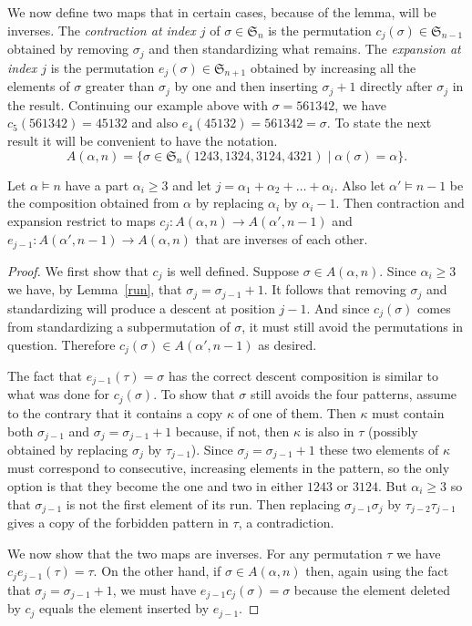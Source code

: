 \documentclass[ALCO,ThmDefs,Unicode,epreuves]{cedram}
\newcommand{\comp}{\models}
\newcommand{\ra}{\rightarrow}
\newcommand{\al}{\alpha}
\newcommand{\ka}{\kappa}
\newcommand{\si}{\sigma}
\newcommand{\fS}{{\mathfrak S}}
\begin{document}
We now define two maps that in certain cases, because of the lemma, will be inverses. The \emph{contraction at index $j$} of $\si\in\fS_n$ is the permutation $c_j(\si)\in\fS_{n-1}$ obtained by removing $\si_j$ and then standardizing what remains. The \emph{expansion at index $j$} is the permutation $e_j(\si)\in\fS_{n+1}$ obtained by increasing all the elements of $\si$ greater than $\si_j$ by one and then inserting $\si_j+1$ directly after $\si_j$ in the result. Continuing our example above with $\si= 561342$, we have $c_5(561342)=45132$ and also $e_4(45132)=561342=\si$. To state the next result it will be convenient to have the notation.
\[
A(\al,n)=\{\si\in\fS_n(1243, 1324, 3124, 4321) \mid \al(\si)=\al\}.
\]
\begin{prop}
\label{inverses}
Let $\al\comp n$ have a part $\al_i\ge3$ and let $j=\al_1+\al_2+\dots+\al_i$. Also let $\al'\comp n-1$ be the composition obtained from $\al$ by replacing $\al_i$ by $\al_i-1$. Then contraction and expansion restrict to maps $c_j:A(\al,n)\ra A(\al',n-1)$ and $e_{j-1}:A(\al',n-1)\ra A(\al,n)$ that are inverses of each other.
\end{prop}
\begin{proof}
We first show that $c_j$ is well defined. Suppose $\si\in A(\al,n)$. Since $\al_i\ge3$ we have, by Lemma~\ref{run}, that $\si_j=\si_{j-1}+1$. It follows that removing $\si_j$ and standardizing will produce a descent at position $j-1$. And since $c_j(\si)$ comes from standardizing a subpermutation of $\si$, it must still avoid the permutations in question. Therefore $c_j(\si)\in A(\al',n-1)$ as desired.

The fact that $e_{j-1}(\tau)=\si$ has the correct descent composition is similar to what was done for $c_j(\si)$. To show that $\si$ still avoids the four patterns, assume to the contrary that it contains a copy $\ka$ of one of them. Then $\ka$ must contain both $\si_{j-1}$ and $\si_j=\si_{j-1}+1$ because, if not, then $\ka$ is also in $\tau$ (possibly obtained by replacing $\si_j$ by $\tau_{j-1}$). Since $\si_j=\si_{j-1}+1$ these two elements of $\ka$ must correspond to consecutive, increasing elements in the pattern, so the only option is that they become the one and two in either $1243$ or $3124$. But $\al_i\ge3$ so that $\si_{j-1}$ is not the first element of its run. Then replacing $\si_{j-1}\si_j$ by $\tau_{j-2}\tau_{j-1}$ gives a copy of the forbidden pattern in $\tau$, a contradiction.

We now show that the two maps are inverses. For any permutation $\tau$ we have $c_j e_{j-1}(\tau)=\tau$. On the other hand, if $\si\in A(\al,n)$ then, again using the fact that $\si_j=\si_{j-1}+1$, we must have $e_{j-1} c_j(\si)=\si$ because the element deleted by $c_j$ equals the element inserted by $e_{j-1}$.
\end{proof}
\end{document}
